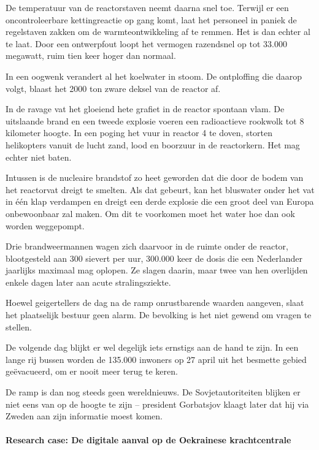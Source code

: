 De temperatuur van de reactorstaven neemt daarna snel toe. Terwijl er een oncontroleerbare kettingreactie op gang komt, laat het personeel in paniek de regelstaven zakken om de warmteontwikkeling af te remmen. Het is dan echter al te laat. Door een ontwerpfout loopt het vermogen razendsnel op tot 33.000 megawatt, ruim tien keer hoger dan normaal.

In een oogwenk verandert al het koelwater in stoom. De ontploffing die daarop volgt, blaast het 2000 ton zware deksel van de reactor af.

In de ravage vat het gloeiend hete grafiet in de reactor spontaan vlam. De uitslaande brand en een tweede explosie voeren een radioactieve rookwolk tot 8 kilometer hoogte. 
In een poging het vuur in reactor 4 te doven, storten helikopters vanuit de lucht zand, lood en boorzuur in de reactorkern. Het mag echter niet baten.

Intussen is de nucleaire brandstof zo heet geworden dat die door de bodem van het reactorvat dreigt te smelten. Als dat gebeurt, kan het bluswater onder het vat in één klap verdampen en dreigt een derde explosie die een groot deel van Europa onbewoonbaar zal maken. Om dit te voorkomen moet het water hoe dan ook worden weggepompt.

Drie brandweermannen wagen zich daarvoor in de ruimte onder de reactor, blootgesteld aan 300 sievert per uur, 300.000 keer de dosis die een Nederlander jaarlijks maximaal mag oplopen. Ze slagen daarin, maar twee van hen overlijden enkele dagen later aan acute stralingsziekte.

Hoewel geigertellers de dag na de ramp onrustbarende waarden aangeven, slaat het plaatselijk bestuur geen alarm. De bevolking is het niet gewend om vragen te stellen.

De volgende dag blijkt er wel degelijk iets ernstigs aan de hand te zijn. In een lange rij bussen worden de 135.000 inwoners op 27 april uit het besmette gebied geëvacueerd, om er nooit meer terug te keren.

De ramp is dan nog steeds geen wereldnieuws. De Sovjetautoriteiten blijken er niet eens van op de hoogte te zijn – president Gorbatsjov klaagt later dat hij via Zweden aan zijn informatie moest komen.
\cite{verschuur14012013tjernobylreports}
\cite{paperlessarchivesTjernobyl}
\cite{vargos082000tjernobylconcerns}
\cite{mauroNuclearRiskSociety}
\cite{vienna06092005LookingBack}



\paragraph{ Research case: De digitale aanval op de Oekrainese krachtcentrale}

